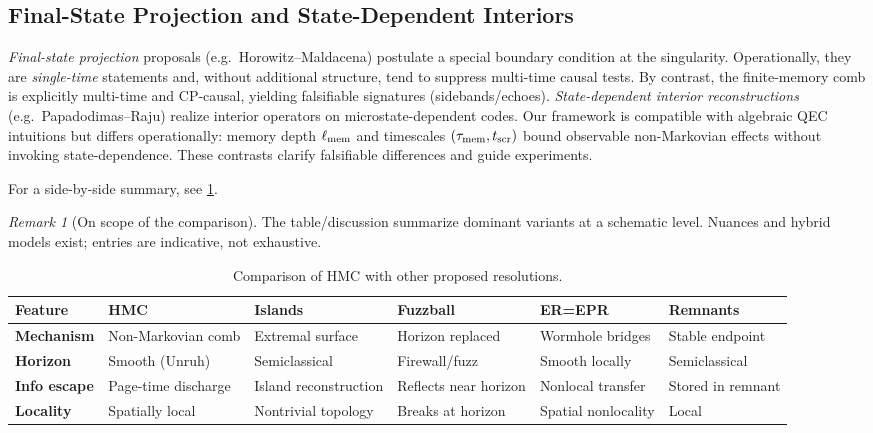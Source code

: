 \documentclass[11pt,a4paper]{article}
\newcommand{\HMC}{\textsc{HMC}\xspace}
\theoremstyle{plain}
\theoremstyle{definition}
\theoremstyle{remark}
\newtheorem{remark}[theorem]{Remark}
\begin{document}
\subsection{Final-State Projection and State-Dependent Interiors}
\emph{Final-state projection} proposals (e.g.\ Horowitz--Maldacena) postulate a special boundary condition at the singularity.
Operationally, they are \emph{single-time} statements and, without additional structure, tend to suppress multi-time causal tests.
By contrast, the finite-memory comb is explicitly multi-time and CP-causal, yielding falsifiable signatures (sidebands/echoes).
\emph{State-dependent interior reconstructions} (e.g.\ Papadodimas--Raju) realize interior operators on microstate-dependent codes.
Our framework is compatible with algebraic QEC intuitions but differs operationally: memory depth $\ell_{\rm mem}$ and
timescales $(\tau_{\rm mem},t_{\rm scr})$ bound observable non-Markovian effects without invoking state-dependence.
These contrasts clarify falsifiable differences and guide experiments.

For a side-by-side summary, see \cref{tab:comparison}.

\begin{remark}[On scope of the comparison]
The table/discussion summarize dominant variants at a schematic level. Nuances and hybrid models exist; entries are indicative, not exhaustive.
\end{remark}

\begin{table}[htbp]
\centering
\caption{Comparison of \HMC{} with other proposed resolutions.}
\label{tab:comparison}
\scriptsize
\begin{tabular*}{\textwidth}{@{\extracolsep{\fill}}llllll@{}}
\toprule
\textbf{Feature} & \textbf{HMC} & \textbf{Islands} & \textbf{Fuzzball} & \textbf{ER=EPR} & \textbf{Remnants} \\ \midrule
\textbf{Mechanism} & Non-Markovian comb & Extremal surface & Horizon replaced & Wormhole bridges & Stable endpoint \\
\addlinespace
\textbf{Horizon} & Smooth (Unruh) & Semiclassical & Firewall/fuzz & Smooth locally & Semiclassical \\
\addlinespace
\textbf{Info escape} & Page-time discharge & Island reconstruction & Reflects near horizon & Nonlocal transfer & Stored in remnant \\
\addlinespace
\textbf{Locality} & Spatially local & Nontrivial topology & Breaks at horizon & Spatial nonlocality & Local \\
\bottomrule
\end{tabular*}
\end{table}
\end{document}
